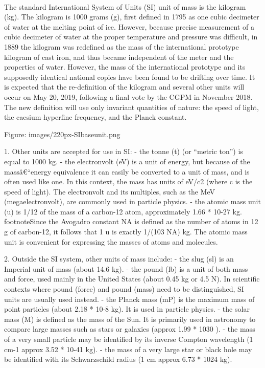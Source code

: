 \documentclass{book}
\begin{document}
	\paragraph{}
	The standard International System of Units (SI) unit of mass is the kilogram (kg). The kilogram is 1000 grams (g), first defined in 1795 as one cubic decimeter of water at the melting point of ice. However, because precise measurement of a cubic decimeter of water at the proper temperature and pressure was difficult, in 1889 the kilogram was redefined as the mass of the international prototype kilogram of cast iron, and thus became independent of the meter and the properties of water. However, the mass of the international prototype and its supposedly identical national copies have been found to be drifting over time. It is expected that the re-definition of the kilogram and several other units will occur on May 20, 2019, following a final vote by the CGPM in November 2018. The new definition will use only invariant quantities of nature: the speed of light, the caesium hyperfine frequency, and the Planck constant.
	
	Figure: images/220px-SIbaseunit.png
	
	1. Other units are accepted for use in SI:
	- the tonne (t) (or ``metric ton'') is equal to 1000 kg.
	- the electronvolt (eV) is a unit of energy, but because of the massâ€“energy equivalence it can easily be converted to a unit of mass, and is often used like one. In this context, the mass has units of eV/c2 (where c is the speed of light). The electronvolt and its multiples, such as the MeV (megaelectronvolt), are commonly used in particle physics.
	- the atomic mass unit (u) is 1/12 of the mass of a carbon-12 atom, approximately 1.66 * 10{-27} kg. footnote{Since the Avogadro constant NA is defined as the number of atoms in 12 g of carbon-12, it follows that 1 u is exactly 1/(103 NA) kg.} The atomic mass unit is convenient for expressing the masses of atoms and molecules.        
	
	2. Outside the SI system, other units of mass include:
	- the slug (sl) is an Imperial unit of mass (about 14.6 kg).
	- the pound (lb) is a unit of both mass and force, used mainly in the United States (about 0.45 kg or 4.5 N). In scientific contexts where pound (force) and pound (mass) need to be distinguished, SI units are usually used instead.
	- the Planck mass (mP) is the maximum mass of point particles (about 2.18 * 10{-8} kg). It is used in particle physics.
	- the solar mass (M) is defined as the mass of the Sun. It is primarily used in astronomy to compare large masses such as stars or galaxies (approx 1.99 * 10{30} ).
	- the mass of a very small particle may be identified by its inverse Compton wavelength (1 cm{-1} approx 3.52 * 10{-41} kg).
	- the mass of a very large star or black hole may be identified with its Schwarzschild radius (1 cm approx 6.73 * 10{24} kg).
	
\end{document}
